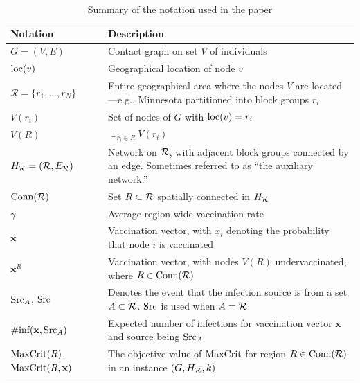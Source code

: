 \begin{table}[ht]
\begin{footnotesize}
\centering \caption{
Summary of the notation used in the paper
}
\label{table:notation}
\begin{tabular}{|p{0.9in}|p{2.2in}|}
\hline
\textbf{Notation} & \textbf{Description} \\
\hline
$G=(V, E)$ & Contact graph on set $V$ of individuals\\
$\text{loc}(v)$ & Geographical location of node $v$\\
$\mathcal{R}=\{r_1,\ldots,r_N\}$ & Entire geographical area where the nodes $V$ are located---e.g., Minnesota partitioned into block groups $r_i$\\
$V(r_i)$ & Set of nodes of $G$ with $\text{loc}(v)=r_i$\\
$V(R)$ & $\cup_{r_i\in R} V(r_i)$\\
$H_{\mathcal{R}}=(\mathcal{R}, E_{\mathcal{R}})$ & Network on $\mathcal{R}$, with adjacent block groups connected by an edge.
Sometimes referred to as ``the auxiliary network.''\\
$\text{Conn}(\mathcal{R})$ & Set $R\subset \mathcal{R}$  spatially connected in $H_{\mathcal{R}}$\\
$\gamma$ & Average region-wide vaccination rate\\
$\mathbf{x}$ & Vaccination vector, with $x_i$ denoting the probability that node $i$
is vaccinated\\
$\mathbf{x}^R$ & Vaccination vector, with nodes $V(R)$ undervaccinated, where $R\in\text{Conn}(\mathcal{R})$\\
$\text{Src}_A$, $\text{Src}$ & Denotes the event that the  infection source is from a 
set $A\subset \mathcal{R}$. $\text{Src}$ is used when $A=\mathcal{R}$ \\
$\#\text{inf}(\mathbf{x}, \text{Src}_A)$ & Expected number of infections for
vaccination vector $\mathbf{x}$ and source being $\text{Src}_A$\\
$\text{MaxCrit}(R)$, $\text{MaxCrit}(R, \mathbf{x})$ & The objective value of $\text{MaxCrit}{}$ for region
$R\in\text{Conn}(\mathcal{R})$ in an instance $(G, H_{\mathcal{R}}, k)$\\
\hline
\end{tabular}
\end{footnotesize}
\end{table}

